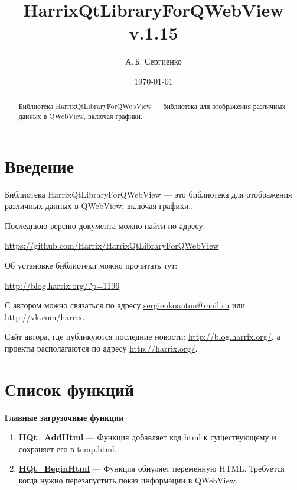 \documentclass[a4paper,12pt]{article}
\title{HarrixQtLibraryForQWebView v.1.15}
\author{А.\,Б. Сергиенко}
\date{\today}
\begin{document}


\maketitle

\begin{abstract}
Библиотека HarrixQtLibraryForQWebView --- библиотека для отображения различных данных в QWebView, включая графики.
\end{abstract}

\tableofcontents

\newpage

\section{Введение}

Библиотека HarrixQtLibraryForQWebView --- это библиотека для отображения различных данных в QWebView, включая графики..

Последнюю версию документа можно найти по адресу:

\href{https://github.com/Harrix/HarrixQtLibraryForQWebView}{https://github.com/Harrix/HarrixQtLibraryForQWebView}

Об установке библиотеки можно прочитать тут:

\href{http://blog.harrix.org/?p=1196}{http://blog.harrix.org/?p=1196}

С автором можно связаться по адресу \href{mailto:sergienkoanton@mail.ru}{sergienkoanton@mail.ru} или  \href{http://vk.com/harrix}{http://vk.com/harrix}.

Сайт автора, где публикуются последние новости: \href{http://blog.harrix.org/}{http://blog.harrix.org/}, а проекты располагаются по адресу \href{http://harrix.org/}{http://harrix.org/}.

\newpage
\section{Список функций}\label{section_listfunctions}
\textbf{Главные загрузочные функции}
\begin{enumerate}

\item \textbf{\hyperref[HQt_AddHtml]{HQt\_AddHtml}} --- Функция добавляет код html к существующему и сохраняет его в temp.html.

\item \textbf{\hyperref[HQt_BeginHtml]{HQt\_BeginHtml}} --- Функция обнуляет переменную HTML. Требуется когда нужно перезапустить показ информации в QWebView.

\end{enumerate}
\end{document}
